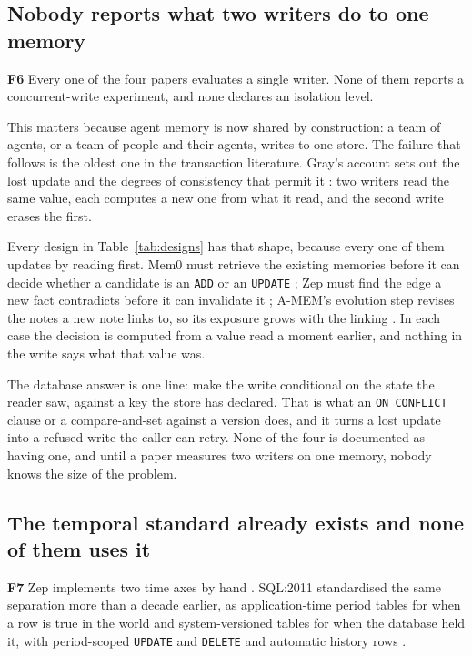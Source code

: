 \documentclass[11pt,a4paper]{article}
\newcommand{\code}[1]{\texttt{\small #1}}
\newcommand{\finding}[1]{{\sffamily\bfseries\color{blue800}#1}\quad}
\begin{document}
\subsection{Nobody reports what two writers do to one memory}
\label{sec:f6}

\finding{F6} Every one of the four papers evaluates a single writer. None
of them reports a concurrent-write experiment, and none declares an
isolation level.

This matters because agent memory is now shared by construction: a team
of agents, or a team of people and their agents, writes to one store. The
failure that follows is the oldest one in the transaction literature.
Gray's account sets out the lost update and the degrees of consistency
that permit it \cite{gray1976}: two writers read the same value, each
computes a new one from what it read, and the second write erases the
first.

Every design in Table~\ref{tab:designs} has that shape, because every one
of them updates by reading first. Mem0 must retrieve the existing
memories before it can decide whether a candidate is an \code{ADD} or an
\code{UPDATE} \cite{mem0}; Zep must find the edge a new fact contradicts
before it can invalidate it \cite{zep}; A-MEM's evolution step revises
the notes a new note links to, so its exposure grows with the linking
\cite{amem}. In each case the decision is computed from a value read a
moment earlier, and nothing in the write says what that value was.

The database answer is one line: make the write conditional on the state
the reader saw, against a key the store has declared. That is what an
\code{ON CONFLICT} clause or a compare-and-set against a version does,
and it turns a lost update into a refused write the caller can retry.
None of the four is documented as having one, and until a paper measures
two writers on one memory, nobody knows the size of the problem.

\subsection{The temporal standard already exists and none of them uses it}
\label{sec:f7}

\finding{F7} Zep implements two time axes by hand \cite{zep}. SQL:2011
standardised the same separation more than a decade earlier, as
application-time period tables for when a row is true in the world and
system-versioned tables for when the database held it, with period-scoped
\code{UPDATE} and \code{DELETE} and automatic history rows
\cite{sql2011}.
\end{document}
